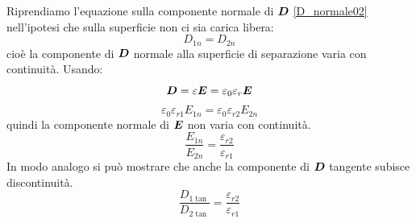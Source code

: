 Riprendiamo l'equazione sulla componente normale di $\boldsymbol{D}$ \eqref{D_normale02} nell'ipotesi che sulla superficie non ci sia carica libera:
\begin{equation}
  D_{1n}=D_{2n}
\end{equation}
cioè la componente di $\boldsymbol{D}$ normale alla superficie di separazione varia con continuità. Usando:
\begin{equation}
  \boldsymbol{D}=\varepsilon\boldsymbol{E}=\varepsilon_0\varepsilon_r \boldsymbol{E}
\end{equation}
\begin{equation}
  \varepsilon_0\varepsilon_{r1} E_{1n}=\varepsilon_0\varepsilon_{r2} E_{2n}
\end{equation}
quindi la componente normale di $\boldsymbol{E}$ non varia con continuità.
\begin{equation}
  \frac{E_{1n}}{E_{2n}}=\frac{\varepsilon_{r2}}{\varepsilon_{r1}}
\end{equation}
In modo analogo si può mostrare che anche la componente di $\boldsymbol{D}$ tangente subisce discontinuità.
\begin{equation}
  \frac{D_{1\tan}}{D_{2\tan}}=\frac{\varepsilon_{r2}}{\varepsilon_{r1}}
\end{equation}

